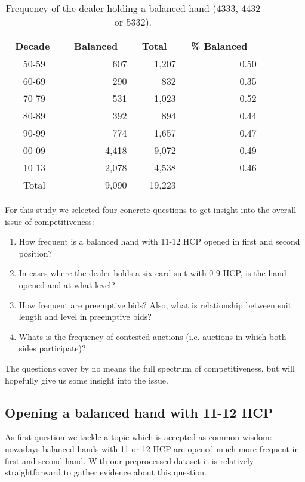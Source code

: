 \documentclass{llncs}
\begin{document}
\begin{table}
\caption{Frequency of the dealer holding a balanced hand (4333, 4432
  or 5332).} 
\label{tbl:balanced-first-hand}
\centering\footnotesize
\begin{tabular}{|c|r|r|r|}
\hline
\bf \ Decade \ & \bf \ Balanced \ & \bf \ Total \  & \bf \ \% Balanced \ \\ \hline 
50-59 & 607 & 1,207 & 0.50 \\
60-69 & 290 & 832 & 0.35 \\
70-79 & 531 & 1,023 & 0.52 \\
80-89 & 392 & 894 & 0.44 \\
90-99 & 774 & 1,657 & 0.47 \\
00-09 & 4,418 & 9,072 & 0.49 \\
10-13 & 2,078 & 4,538 & 0.46 \\ 
\hline
Total & 9,090 & 19,223 &  \\
\hline
\end{tabular}
\end{table}

For this study we selected four concrete questions to get insight into
the overall issue of competitiveness:
\begin{enumerate}
\item How frequent is a balanced hand with 11-12 HCP opened in first
  and second position?
\item In cases where the dealer holds a six-card suit with 0-9 HCP, is
  the hand opened and at what level? 
\item How frequent are preemptive bids? Also, what is relationship
  between suit length and level in preemptive bids? 
\item Whats is the frequency of contested auctions (i.e. auctions in
  which both sides participate)?   
\end{enumerate}

The questions cover by no means the full spectrum of competitiveness,
but will hopefully give us some insight into the issue.   

\subsection{Opening a balanced hand with 11-12 HCP}

As first question we tackle a topic which is accepted as common
wisdom: nowadays balanced hands with 11 or 12 HCP are opened 
much more frequent in first and second hand.  With our preprocessed
dataset it is relatively straightforward to gather evidence about this
question. 
\end{document}
